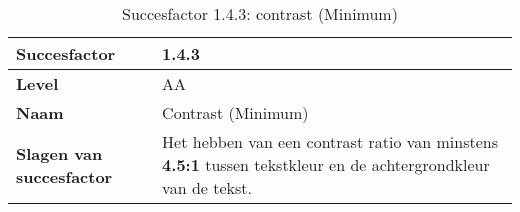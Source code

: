 \begin{table}[H]
    \centering
    \caption{Succesfactor 1.4.3: contrast (Minimum)}
    \begin{threeparttable}

 
    \hspace*{-1cm}\begin{tabular}{|l|p{12cm}|} 
        \hline
        \textbf{Succesfactor}                 & 1.4.3                                                                                                                                                                                                                                                                                                                                                                                                                                                                                                          \\ 
        \hline
        \textbf{Level}                        & AA                                                                                                                                                                                                                                                                                                                                                                                                                                                                                                                 \\ 
        \hline
        \textbf{Naam}                         & Contrast (Minimum)~                                                                                                                                                                                                                                                                                                                                                                                                                                                                                      \\ 
        \hline
        \textbf{Slagen van succesfactor}      & Het hebben van een contrast ratio van minstens \textbf{4.5:1} tussen tekstkleur en de achtergrondkleur van de tekst.                                                                                                                                                                                                    \\ 
        \hline

\end{tabular}
\end{threeparttable}
\end{table}
